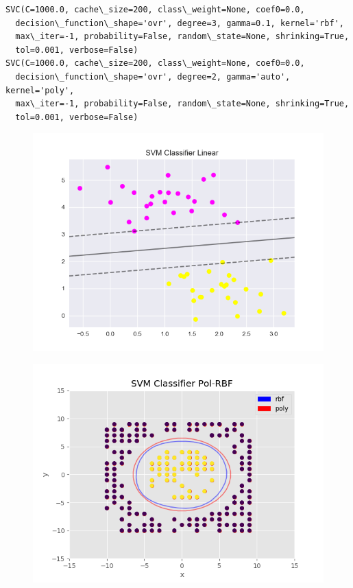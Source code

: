 \documentclass[11pt]{article}
\makeatletter
\def\maxwidth{\ifdim\Gin@nat@width>\linewidth\linewidth
    \else\Gin@nat@width\fi}
\let\Oldincludegraphics\includegraphics
\renewcommand{\includegraphics}[1]{\Oldincludegraphics[width=.8\maxwidth]{#1}}
\makeatother
\begin{document}
    \begin{Verbatim}[commandchars=\\\{\}]
SVC(C=1000.0, cache\_size=200, class\_weight=None, coef0=0.0,
  decision\_function\_shape='ovr', degree=3, gamma=0.1, kernel='rbf',
  max\_iter=-1, probability=False, random\_state=None, shrinking=True,
  tol=0.001, verbose=False)
SVC(C=1000.0, cache\_size=200, class\_weight=None, coef0=0.0,
  decision\_function\_shape='ovr', degree=2, gamma='auto', kernel='poly',
  max\_iter=-1, probability=False, random\_state=None, shrinking=True,
  tol=0.001, verbose=False)

    \end{Verbatim}

    \begin{figure}
\centering
\includegraphics{assignment/svm/svc_lr.png}
\caption{}
\end{figure}

    \begin{figure}
\centering
\includegraphics{assignment/svm/svc_pol.png}
\caption{}
\end{figure}
\end{document}
